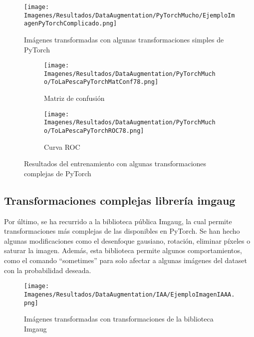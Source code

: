 \documentclass{report}
\begin{document}
\begin{figure}[H]
    \centering
    \texttt{[image: Imagenes/Resultados/DataAugmentation/PyTorchMucho/EjemploImagenPyTorchComplicado.png]}
    \caption{ Imágenes transformadas con algunas transformaciones simples de PyTorch }
    \label{fig:DataAugmenEjPytorchComp}
\end{figure}



\vspace{0.4cm}
\begin{figure}[H]
	 	\centering
	 	\begin{subfigure}[b]{0.45\linewidth}
	 	\centering
	 		\texttt{[image: Imagenes/Resultados/DataAugmentation/PyTorchMucho/ToLaPescaPyTorchMatConf78.png]}
	 		\caption{ Matriz de confusión }
                    \label{fig:DataAugmenEjPytorchCompleMatConf}
	 	\end{subfigure}
	 	\begin{subfigure}[b]{0.45\linewidth}
	 	\centering
	 		\texttt{[image: Imagenes/Resultados/DataAugmentation/PyTorchMucho/ToLaPescaPyTorchROC78.png]}
                    \caption{ Curva ROC }
                    \label{fig:DataAugmenEjPytorchCompROC}
	 	\end{subfigure}
	 	\caption{ Resultados del entrenamiento con algunas transformaciones complejas de PyTorch}
	 	\label{fig:DataAugmentationPytorchCompleResults}
\end{figure}




\subsection{Transformaciones complejas librería imgaug}


Por último, se ha recurrido a la biblioteca pública Imgaug, la cual permite transformaciones más complejas de las disponibles en PyTorch. Se han hecho algunas modificaciones como el desenfoque gausiano, rotación, eliminar píxeles o saturar la imagen. Además, esta biblioteca permite algunos comportamientos, como el comando ``sometimes'' para solo afectar a algunas imágenes del dataset con la probabilidad deseada.

\begin{figure}[H]
    \centering
    \texttt{[image: Imagenes/Resultados/DataAugmentation/IAA/EjemploImagenIAAA.png]}
    \caption{ Imágenes transformadas con transformaciones de la biblioteca Imgaug }
    \label{fig:DataAugmenEjIAA}
\end{figure}
\end{document}
